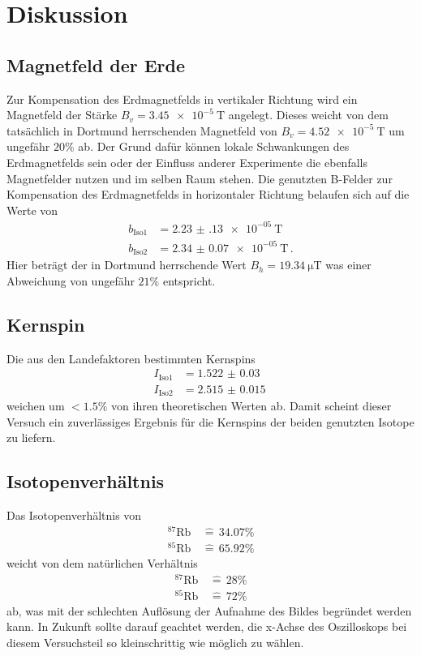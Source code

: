 \newpage
\section{Diskussion}
\label{sec:diskussion}
\subsection{Magnetfeld der Erde}
Zur Kompensation des Erdmagnetfelds in vertikaler Richtung wird ein Magnetfeld der Stärke $B_v = \SI{3.45e-5}{\tesla}$ angelegt.
Dieses weicht von dem tatsächlich in Dortmund herrschenden Magnetfeld von $B_v=\SI{4.52e-5}{\tesla}$ \cite{mag_DO_2} um ungefähr $20\%$ ab.
Der Grund dafür können lokale Schwankungen des Erdmagnetfelds sein oder der Einfluss anderer Experimente die ebenfalls Magnetfelder nutzen und im selben Raum stehen.
Die genutzten B-Felder zur Kompensation des Erdmagnetfelds in horizontaler Richtung belaufen sich auf die Werte von
\begin{align*}
b_\text{Iso1} & = \SI{2.23(13)e-05}{\tesla} \\
b_\text{Iso2} &= \SI{2.34(7)e-05}{\tesla} \, .
\end{align*}
Hier beträgt der in Dortmund herrschende Wert $B_h=\SI{19.34}{\micro\tesla}$ was einer Abweichung von ungefähr $21\%$ entspricht.
\subsection{Kernspin}
Die aus den Landefaktoren bestimmten Kernspins 
\begin{align*}
    I_\text{Iso1} &= \SI{1.522(30)}{}\\
    I_\text{Iso2} &= \SI{2.515(15)}{}
\end{align*}
weichen um $<1.5\%$ von ihren theoretischen Werten ab.
Damit scheint dieser Versuch ein zuverlässiges Ergebnis für die Kernspins der beiden genutzten Isotope zu liefern.
\subsection{Isotopenverhältnis}
Das Isotopenverhältnis von 
\begin{align*}
    ^{87}\text{Rb} \, &\widehat{=}\, 34.07\% \\
    ^{85}\text{Rb} \, &\widehat{=}\, 65.92\%
\end{align*}
weicht von dem natürlichen Verhältnis
\begin{align*}
    ^{87}\text{Rb} \, &\widehat{=}\, 28\% \\
    ^{85}\text{Rb} \, &\widehat{=}\, 72\%
\end{align*}
ab, was mit der schlechten Auflösung der Aufnahme des Bildes begründet werden kann.
In Zukunft sollte darauf geachtet werden, die x-Achse des Oszilloskops bei diesem Versuchsteil so kleinschrittig wie möglich zu wählen.
